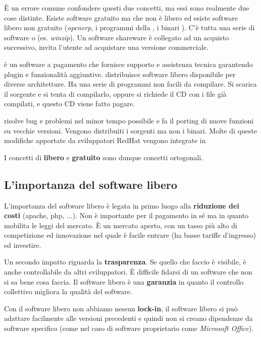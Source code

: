 È un errore comune confondere questi due concetti, ma essi sono realmente due cose distinte. Esiste software gratuito ma che non è libero ed esiste software libero non gratuito (\textit{openerp}, i programmi della , i binari ). C'è tutta una serie di software  o  (es. \textit{winzip}). Un software shareware è collegato ad un acquisto successivo, invita l'utente ad acquistare una versione commerciale.

 è un software a pagamento che fornisce supporto e assistenza tecnica garantendo plugin e funzionalità aggiuntive. 
 distribuisce software libero disponibile per diverse architetture. Ha una serie di programmi non facili da compilare. Si scarica il sorgente e si tenta di compilarlo, oppure si richiede il CD con i file già compilati, e questo CD viene fatto pagare.

 risolve bug e problemi nel minor tempo possibile e fa il porting di nuove funzioni su vecchie versioni. Vengono distribuiti i sorgenti ma non i binari. Molte di queste modifiche apportate da sviluppatori RedHat vengono integrate in 

I concetti di \textbf{libero} e \textbf{gratuito} sono dunque concetti ortogonali.

\subsection{L'importanza del software libero}

L'importanza del software libero è legata in primo luogo alla \textbf{riduzione dei costi} (apache, php, ...). Non è importante per il pagamento in sé ma in quanto mobilita le leggi del mercato. È un mercato aperto, con un tasso più alto di competizione ed innovazione nel quale è facile entrare (ha basse tariffe d'ingresso) ed investire.

Un secondo impatto riguarda la \textbf{trasparenza}. Se quello che faccio è visibile, è anche controllabile da altri sviluppatori. È difficile fidarsi di un software che non si sa bene cosa faccia. Il software libero è una \textbf{garanzia} in quanto il controllo collettivo migliora la qualità del software.

Con il software libero non abbiamo nessun \textbf{lock-in}, il software libero si può adattare facilmente alle versioni precedenti e quindi non si creano dipendenze da software specifico (come nel caso di software proprietario come \textit{Microsoft Office}).

